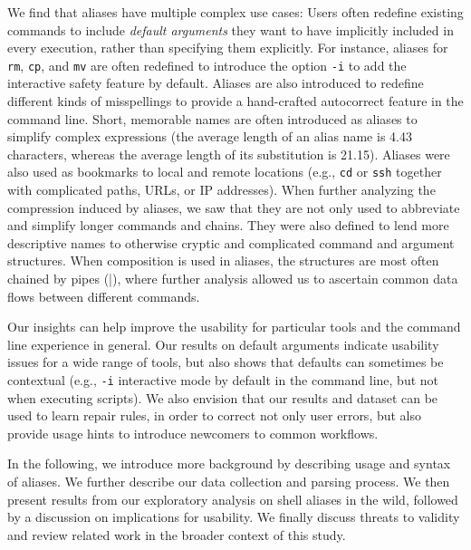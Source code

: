 We find that aliases have multiple complex use cases:
Users often redefine existing commands to include \emph{default arguments} they want to have implicitly included in every execution, rather than specifying them explicitly.
For instance, aliases for \verb|rm|, \verb|cp|, and \verb|mv| are often redefined to introduce the option \verb|-i| to add the interactive safety feature by default.
Aliases are also introduced to redefine different kinds of misspellings to provide a hand-crafted autocorrect feature in the command line. 
Short, memorable names are often introduced as aliases to simplify complex expressions (the average length of an alias name is 4.43 characters, whereas the average length of its substitution is 21.15).
Aliases were also used as bookmarks to local and remote locations (e.g., \verb|cd| or \verb|ssh| together with complicated paths, URLs, or IP addresses).
When further analyzing the compression induced by aliases, we saw that they are not only used to abbreviate and simplify longer commands and chains.
They were also defined to lend more descriptive names to otherwise cryptic and complicated command and argument structures.
When composition is used in aliases, the structures are most often chained by pipes (\verb|||), where further analysis allowed us to ascertain common data flows between different commands.

Our insights can help improve the usability for particular tools and the command line experience in general.
Our results on default arguments indicate usability issues for a wide range of tools, but also shows that defaults can sometimes be contextual (e.g., \verb|-i| interactive mode by default in the command line, but not when executing scripts).
We also envision that our results and dataset can be used to learn repair rules, in order to correct not only user errors, but also provide usage hints to introduce newcomers to common workflows.

In the following, we introduce more background by describing usage and syntax of aliases. We further describe our data collection and parsing process. We then present results from our exploratory analysis on shell aliases in the wild, followed by a discussion on implications for usability. We finally discuss threats to validity and review related work in the broader context of this study. 